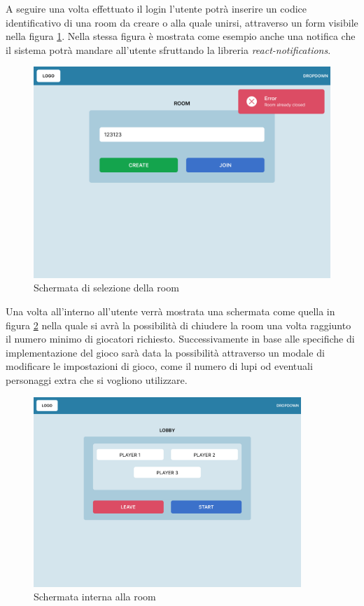 A seguire una volta effettuato il login l'utente potrà inserire un codice identificativo di una room da creare o alla quale unirsi, attraverso un form visibile nella figura \ref{fig:pcRoom}. Nella stessa figura è mostrata come esempio anche una notifica che il sistema potrà mandare all'utente sfruttando la libreria \emph{react-notifications}\cite{npmjsReactnotifications}.

\begin{figure}[H]
\centering
\includegraphics[width=\textwidth]{img/figma/Wireframe-2.png}
\caption{Schermata di selezione della room}
\label{fig:pcRoom}
\end{figure}

\newpage

Una volta all'interno all'utente verrà mostrata una schermata come quella in figura \ref{fig:pcLobby} nella quale si avrà la possibilità di chiudere la room una volta raggiunto il numero minimo di giocatori richiesto. Successivamente in base alle specifiche di implementazione del gioco sarà data la possibilità attraverso un modale di modificare le impostazioni di gioco, come il numero di lupi od eventuali personaggi extra che si vogliono utilizzare.

\begin{figure}[H]
\centering
\includegraphics[width=0.9\textwidth]{img/figma/Wireframe-3.png}
\caption{Schermata interna alla room}
\label{fig:pcLobby}
\end{figure}

